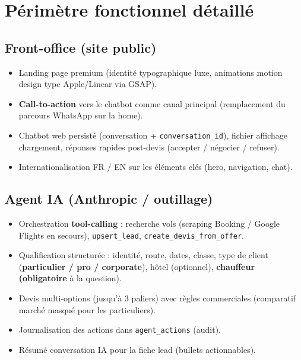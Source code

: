 \documentclass[11pt,a4paper]{article}
\begin{document}
\section{Périmètre fonctionnel détaillé}

\subsection{Front-office (site public)}
\begin{itemize}[leftmargin=*]
  \item Landing page premium (identité typographique luxe, animations motion design type Apple/Linear via GSAP).
  \item \textbf{Call-to-action} vers le chatbot comme canal principal (remplacement du parcours WhatsApp sur la home).
  \item Chatbot web persisté (conversation + \texttt{conversation\_id}), fichier affichage chargement, réponses rapides post-devis (accepter / négocier / refuser).
  \item Internationalisation FR / EN sur les éléments clés (hero, navigation, chat).
\end{itemize}

\subsection{Agent IA (Anthropic / outillage)}
\begin{itemize}[leftmargin=*]
  \item Orchestration \textbf{tool-calling} : recherche vols (scraping Booking / Google Flights en secours), \texttt{upsert\_lead}, \texttt{create\_devis\_from\_offer}.
  \item Qualification structurée : identité, route, dates, classe, type de client (\textbf{particulier / pro / corporate}), hôtel (optionnel), \textbf{chauffeur (obligatoire} à la question).
  \item Devis multi-options (jusqu'à 3 paliers) avec règles commerciales (comparatif marché masqué pour les particuliers).
  \item Journalisation des actions dans \texttt{agent\_actions} (audit).
  \item Résumé conversation IA pour la fiche lead (bullets actionnables).
\end{itemize}
\end{document}
